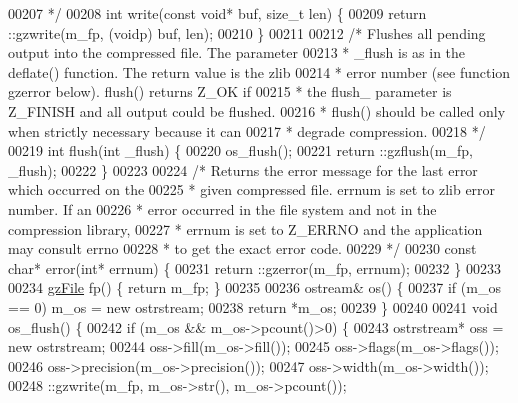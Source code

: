 \begin{DoxyCode}
00207 \textcolor{comment}{         */}
00208         \textcolor{keywordtype}{int} write(\textcolor{keyword}{const} \textcolor{keywordtype}{void}* buf, \textcolor{keywordtype}{size\_t} len) \{
00209             return ::gzwrite(m\_fp, (voidp) buf, len);
00210         \}
00211 
00212         \textcolor{comment}{/* Flushes all pending output into the compressed file. The parameter}
00213 \textcolor{comment}{         * \_flush is as in the deflate() function. The return value is the zlib}
00214 \textcolor{comment}{         * error number (see function gzerror below). flush() returns Z\_OK if}
00215 \textcolor{comment}{         * the flush\_ parameter is Z\_FINISH and all output could be flushed.}
00216 \textcolor{comment}{         * flush() should be called only when strictly necessary because it can}
00217 \textcolor{comment}{         * degrade compression.}
00218 \textcolor{comment}{         */}
00219         \textcolor{keywordtype}{int} flush(\textcolor{keywordtype}{int} \_flush) \{
00220             os\_flush();
00221             return ::gzflush(m\_fp, \_flush);
00222         \}
00223 
00224         \textcolor{comment}{/* Returns the error message for the last error which occurred on the}
00225 \textcolor{comment}{         * given compressed file. errnum is set to zlib error number. If an}
00226 \textcolor{comment}{         * error occurred in the file system and not in the compression library,}
00227 \textcolor{comment}{         * errnum is set to Z\_ERRNO and the application may consult errno}
00228 \textcolor{comment}{         * to get the exact error code.}
00229 \textcolor{comment}{         */}
00230         \textcolor{keyword}{const} \textcolor{keywordtype}{char}* error(\textcolor{keywordtype}{int}* errnum) \{
00231             return ::gzerror(m\_fp, errnum);
00232         \}
00233 
00234         \hyperlink{structgz_file__s}{gzFile} fp() \{ \textcolor{keywordflow}{return} m\_fp; \}
00235 
00236         ostream& os() \{
00237             \textcolor{keywordflow}{if} (m\_os == 0) m\_os = \textcolor{keyword}{new} ostrstream;
00238             \textcolor{keywordflow}{return} *m\_os;
00239         \}
00240 
00241         \textcolor{keywordtype}{void} os\_flush() \{
00242             \textcolor{keywordflow}{if} (m\_os && m\_os->pcount()>0) \{
00243                 ostrstream* oss = \textcolor{keyword}{new} ostrstream;
00244                 oss->fill(m\_os->fill());
00245                 oss->flags(m\_os->flags());
00246                 oss->precision(m\_os->precision());
00247                 oss->width(m\_os->width());
00248                 ::gzwrite(m\_fp, m\_os->str(), m\_os->pcount());

\end{DoxyCode}
